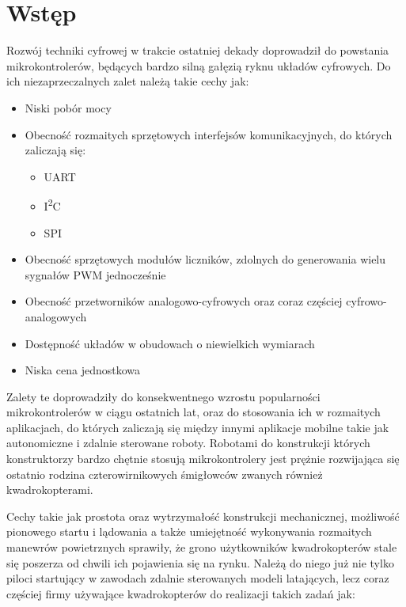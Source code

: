 
\chapter{Wstęp} %
\setcounter{page}{7}
\label{Chapter1} %


Rozwój techniki cyfrowej w trakcie ostatniej dekady doprowadził do powstania mikrokontrolerów, będących bardzo silną gałęzią ryknu układów cyfrowych. Do ich niezaprzeczalnych zalet należą takie cechy jak:

\begin{itemize}
	\item Niski pobór mocy
	\item Obecność rozmaitych sprzętowych interfejsów komunikacyjnych, do których zaliczają się:
		\begin{itemize}
			\item UART
			\item I\textsuperscript{2}C
			\item SPI
		\end{itemize}
	\item Obecność sprzętowych modułów liczników, zdolnych do generowania wielu sygnałów PWM jednocześnie
	\item Obecność przetworników analogowo-cyfrowych oraz coraz częściej cyfrowo-analogowych
	\item Dostępność układów w obudowach o niewielkich wymiarach
	\item Niska cena jednostkowa 
\end{itemize}

Zalety te doprowadziły do konsekwentnego wzrostu popularności mikrokontrolerów w ciągu ostatnich lat, oraz do stosowania ich w rozmaitych aplikacjach, do których zaliczają się między innymi aplikacje mobilne takie jak autonomiczne i zdalnie sterowane roboty.
Robotami do konstrukcji których konstruktorzy bardzo chętnie stosują mikrokontrolery jest prężnie rozwijająca się ostatnio rodzina czterowirnikowych śmigłowców zwanych również kwadrokopterami. 

Cechy takie jak prostota oraz wytrzymałość konstrukcji mechanicznej, możliwość pionowego startu i lądowania a także umiejętność wykonywania rozmaitych manewrów powietrznych sprawiły, że grono użytkowników kwadrokopterów stale się poszerza od chwili ich pojawienia się na rynku.
Należą do niego już nie tylko piloci startujący w zawodach zdalnie sterowanych modeli latających, lecz coraz częściej firmy używające kwadrokopterów do realizacji takich zadań jak:

